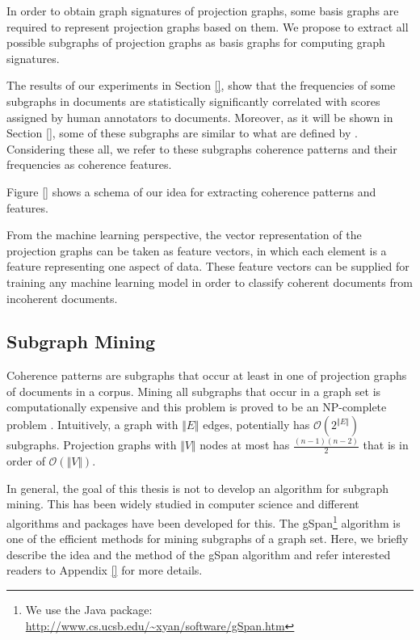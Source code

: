 In order to obtain graph signatures of projection graphs, some basis graphs are required to represent projection graphs based on them. 
We propose to extract all possible subgraphs of projection graphs as basis graphs for computing graph signatures. 

The results of our experiments in Section \ref{}, show that the frequencies of some subgraphs in documents are statistically significantly correlated with scores assigned by human annotators to documents. 
Moreover, as it will be shown in Section \ref{}, some of these subgraphs are similar to what are defined by . 
Considering these all, we refer to these subgraphs coherence patterns and their frequencies as coherence features.  

Figure \ref{} shows a schema of our idea for extracting coherence patterns and features. 

From the machine learning perspective, the vector representation of the projection graphs can be taken as feature vectors, in which each element is a feature representing one aspect of data. 
These feature vectors can be supplied for training any machine learning model in order to classify coherent documents from incoherent documents. 

\subsection{Subgraph Mining}
\label{subsec:subgraph_mining}
%
Coherence patterns are subgraphs that occur at least in one of projection graphs of documents in a corpus. 
Mining all subgraphs that occur in a graph set is computationally expensive and this problem is proved to be an NP-complete problem \cite{}. 
Intuitively, a graph with $\Vert E \Vert$ edges, potentially has $\mathcal{O} \left( 2^{\Vert E \Vert} \right)$ subgraphs.  
Projection graphs with $\Vert V \Vert$ nodes at most has  $\frac{(n-1)(n-2)}{2}$ that is in order of $\mathcal{O} \left( \Vert V \Vert \right)$.  

In general, the goal of this thesis is not to develop an algorithm for subgraph mining. 
This has been widely studied in computer science and different algorithms and packages have been developed for this. 
The gSpan\footnote{We use the Java package: \url{http://www.cs.ucsb.edu/~xyan/software/gSpan.htm}}  algorithm \cite{yanxifeng02} is one of the efficient methods for mining subgraphs of a  graph set. 
Here, we briefly describe the idea and the method of the gSpan algorithm and refer interested readers to Appendix \ref{} for more details. 

